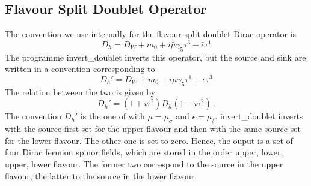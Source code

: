 \subsection{Flavour Split Doublet Operator}

The convention we use internally for the flavour split doublet Dirac
operator is 
\[
D_h = D_W + m_0 + i\bar\mu\gamma_5\tau^3 - \bar\epsilon\tau^1
\]
The programme {\ttfamily invert\_doublet} inverts this operator, but
the source and sink are written in a convention corresponding to
\[
D_h' = D_W + m_0 + i\bar\mu\gamma_5\tau^1 + \bar\epsilon\tau^3
\]
The relation between the two is given by
\[
D_h' = (1+i\tau^2)D_h(1-i\tau^2)\, .
\]
The convention $D_h'$ is the one of \cite{Chiarappa:2006ae} with
$\bar\mu = \mu_\sigma$ and $\bar\epsilon = \mu_\delta$. {\ttfamily
  invert\_doublet} inverts with the source first set for the upper
flavour and then with the same source set for the lower
flavour. The other one is set to zero. Hence, the ouput is a set of
four Dirac fermion spinor fields, which are stored in the order upper,
lower, upper, lower flavour. The former two correspond to the source
in the upper flavour, the latter to the source in the lower flavour.



